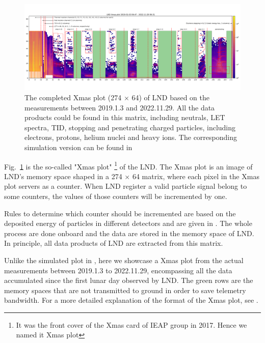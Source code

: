 \begin{figure}
    \centering
    \includegraphics[width =0.95\textheight, height = 0.4\textheight, angle = 90]{images/xmas-2019-01-03To2022-11-29.png}
    \caption[\ac{LND} Xmas plot from measurements]{The completed Xmas plot (274 $\times$ 64) of \ac{LND} based on the measurements between 2019.1.3 and 2022.11.29. All the data products could be found in this matrix, including neutrals, \ac{LET} spectra, \ac{TID}, stopping and penetrating charged particles, including electrons, protons, helium nuclei and heavy ions. The corresponding simulation version can be found in \citet{Wimmer2020SSRv}}
    \label{Fig:measurement_Xmas}
\end{figure}

Fig.~\ref{Fig:measurement_Xmas} is the so-called "Xmas plot" \footnote{It was the front cover of the Xmas card of IEAP group in 2017. Hence we named it Xmas plot} of the \ac{LND}. The Xmas plot is an image of \ac{LND}'s memory space shaped in a 274 $\times$ 64 matrix, where each pixel in the Xmas plot servers as a counter. When \ac{LND} register a valid particle signal belong to some counters, the values of those counters will be incremented by one. 

Rules to determine which counter should be incremented are based on the deposited energy of particles in different detectors and are given in \citet{Wimmer2020SSRv}. The whole process are done onboard and the data are stored in the memory space of \ac{LND}.
In principle, all data products of \ac{LND} are extracted from this matrix. 
 

Unlike the simulated plot in \citet{Wimmer2020SSRv}, here we showcase a Xmas plot from the actual measurements between 2019.1.3 to 2022.11.29, encompassing all the data accumulated since the first lunar day observed by \ac{LND}. The green rows are the memory spaces that are not transmitted to ground in order to save telemetry bandwidth. 
For a more detailed explanation of the format of the Xmas plot, see \citet{Wimmer2020SSRv}.


